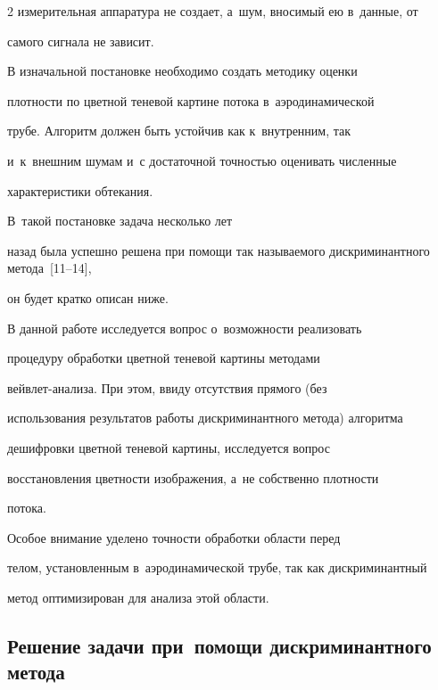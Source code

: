 \begin{multicols}{2}
измерительная аппаратура не создает, а~шум, вносимый ею в~данные, от

самого сигнала не зависит.



В изначальной постановке необходимо создать методику оценки

плотности по цветной теневой картине потока в~аэродинамической

трубе. Алгоритм должен быть устойчив как к~внутренним, так 

и~к~внешним шумам и~с достаточной точностью оценивать численные

характеристики обтекания. 

{



}



В~такой постановке задача несколько лет

назад была успешно решена при помощи так называемого дискриминантного метода~[11--14], 

он будет кратко описан ниже.



В данной работе исследуется вопрос о~возможности реализовать

процедуру обработки цветной теневой картины методами

вейв\-лет-ана\-ли\-за. При этом, ввиду отсутствия прямого (без

использования результатов работы дискриминантного метода) алгоритма

дешифровки цветной теневой картины, исследуется вопрос

восстановления цветности изоб\-ра\-же\-ния, а~не собственно плотности

потока. 



Особое внимание уделено точности обработки об\-ласти перед

телом, установленным в~аэродинамической трубе, так как дискриминантный

метод оптимизирован для анализа этой об\-ласти.







\subsection{Решение задачи при~помощи дискриминантного метода}




\end{multicols}
